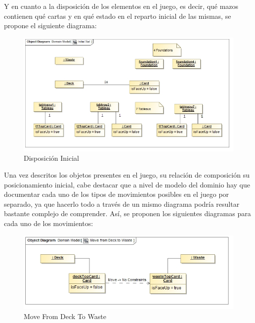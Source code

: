 \documentclass[11pt]{article}
\begin{document}
Y en cuanto a la disposición de los elementos en el juego, es decir, qué mazos contienen qué cartas y en qué estado en el reparto inicial de las mismas, se propone el siguiente diagrama:

\begin{center}
 \begin{figure}[H]
 \begin{center}
   \includegraphics[width=16cm]{DomainModel/InitialSet00.jpg}
   \caption{Disposición Inicial}
   \label{fig:initialset}
 \end{center}
 \end{figure}
\end{center}

Una vez descritos los objetos presentes en el juego, su relación de composición su posicionamiento inicial, cabe destacar que a nivel de modelo del dominio hay que documentar cada uno de los tipos de movimientos posibles en el juego por separado, ya que hacerlo todo a través de un mismo diagrama podría resultar bastante complejo de comprender. Así, se proponen los siguientes diagramas para cada uno de los movimientos:

\begin{center}
 \begin{figure}[H]
 \begin{center}
   \includegraphics[width=15cm]{DomainModel/MoveFromDeckToWaste00.jpg}
   \caption{Move From Deck To Waste}
   \label{fig:deck2waste}
 \end{center}
 \end{figure}
\end{center}
\end{document}
